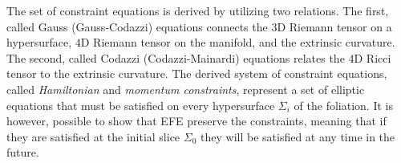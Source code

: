 The set of constraint equations is derived by utilizing two relations.
The first, called Gauss (Gauss-Codazzi) equations 
connects the $3$D Riemann tensor on a hypersurface, $4$D Riemann tensor on the manifold, and the extrinsic curvature. The second, called 
Codazzi (Codazzi-Mainardi) equations relates the $4$D Ricci tensor to the extrinsic curvature. 
%
%
The derived system of constraint equations, called 
\textit{Hamiltonian} and \textit{momentum constraints}, 
represent a set of elliptic equations that must be satisfied on 
every hypersurface $\Sigma_i$ of the foliation. 
%
It is however, possible to show that \ac{EFE} preserve the constraints, 
meaning that if they are satisfied at the initial slice $\Sigma_0$ 
they will be satisfied at any time in the future.




